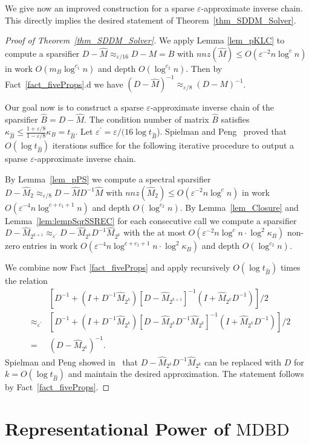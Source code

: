 \documentclass[11pt]{article}
\newcommand{\MDBD}{\mathrm{MDBD}}
\newcommand{\hM}{\widehat{M}}
\newcommand{\hB}{\widehat{B}}
\newcommand{\Di}{D^{-1}}
\newcommand{\prm}{\prime}
\newcommand{\eps}{\epsilon}
\renewcommand{\leq}{\leqslant}
\newcommand{\lemref}[1]{Lemma~\ref{lem:#1}}
\renewcommand{\eps}{\varepsilon}
\numberwithin{thm}{section}
\begin{document}
We give now an improved construction for a sparse $\eps$-approximate inverse chain. This directly implies the desired statement of Theorem~\ref{thm_SDDM_Solver}.

\begin{proof}[Proof of Theorem~\ref{thm_SDDM_Solver}]

We apply Lemma \ref{lem_pKLC} to compute a sparsifier $D-\hM \approx_{\eps/16}D-M=B$ with $nnz(\hM )\leq O(\eps^{-2}n\log^{c} n)$ in work $O(m_{B}\log^{c_1}n)$ and depth $O(\log^{c_2}n)$. Then by Fact~\ref{fact_fiveProps}.d we have $(D-\hM )^{-1}\approx_{\eps/8}(D-M)^{-1}$.

Our goal now is to construct a sparse $\eps$-approximate inverse chain of the sparsifier $\hB=D-\hM$. The condition number of matrix $\hB$ satisfies $\kappa_{\hB}\leq\frac{1+\eps/8}{1-\eps/8}\kappa_{B}=t_{\hB}$. Let $\eps^{\prm}=\eps/(16\log t_{\hB}$). Spielman and Peng~\cite{PS14} proved that $O(\log t_{\hB})$ iterations suffice for the following iterative procedure to output a sparse $\eps$-approximate inverse chain.

By Lemma~\ref{lem_pPS} we compute a spectral sparsifier $D-\hM_{2}\approx_{\eps/8}D-\hM \Di \hM$ with $nnz(\hM_2)\leq O(\eps^{-2}n\log^{c}n)$ in work $O(\eps^{-4}n\log^{c+c_1+1}n)$ and depth $O(\log^{c_2}n)$. By Lemma~\ref{lem_Closure} and \lemref{lempSqrSSREC} for each consecutive call we compute a sparsifier $D-\hM_{2^{k+1}}\approx_{\eps^{\prm}}D-\hM_{2^k} \Di \hM_{2^k}$ with the at most $O(\eps^{-2}n\log^{c}n\cdot\log^{2}\kappa_B)$ non-zero entries in work $O(\eps^{-4}n\log^{c+c_1+1}n\cdot\log^{2}\kappa_B)$ and depth $O(\log^{c_2}n)$.

We combine now Fact \ref{fact_fiveProps} and apply recursively $O(\log t_{\hB})$ times the relation
\begin{eqnarray*}
& & [\Di+(I+\Di\hM_{2^{k}})[D-\hM_{2^{k+1}}]^{-1}(I+\hM_{2^{k}}\Di)]/2\\ & \approx_{\eps^{\prm}} & [\Di+(I+\Di\hM_{2^{k}})[D-\hM_{2^{k}}\Di\hM_{2^{k}}]^{-1}(I+\hM_{2^{k}}\Di)]/2\\&=&(D-\hM_{2^{k}})^{-1}.
\end{eqnarray*}
Spielman and Peng showed in~\cite[Corollary 5.5]{PS14} that $D-\hM_{2^{k}}\Di\hM_{2^{k}}$ can be replaced with $D$ for $k=O(\log t_{\hB})$ and maintain the desired approximation. The statement follows by Fact~\ref{fact_fiveProps}.
\end{proof}



\section{Representational Power of $\MDBD$}\label{sec:APMDBD}
\end{document}
